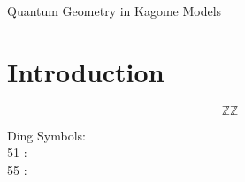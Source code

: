 \documentclass[12pt]{article} %
\author{Nabil Atlam}
\date{December 2024}
\renewcommand{\title}[1]{\vbox{\center\LARGE{#1}}\vspace{5mm}}
\begin{document}
\begin{titlepage}
    \hfill
    \title{Quantum Geometry in Kagome Models}

\end{titlepage}


\section{Introduction}

\begin{equation}
    \mathds{Z} \mathbb{Z}
\end{equation}




\ifdefined\TESTPIFONT
    Ding Symbols: \\
    51 : \\
    55 : 
\fi
\end{document}
